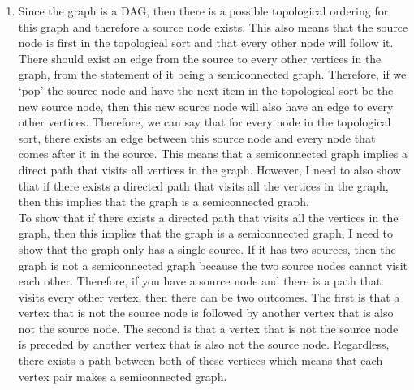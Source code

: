 \documentclass[11pt]{article}
\begin{document}
\begin{enumerate}[label=(\alph*)]
\item
Since the graph is a DAG, then there is a possible topological ordering for this graph and therefore a source node exists. This also means that the source node is first in the topological sort and that every other node will follow it. There should exist an edge from the source to every other vertices in the graph, from the statement of it being a semiconnected graph. Therefore, if we `pop' the source node and have the next item in the topological sort be the new source node, then this new source node will also have an edge to every other vertices. Therefore, we can say that for every node in the topological sort, there exists an edge between this source node and every node that comes after it in the source. This means that a semiconnected graph implies a direct path that visits all vertices in the graph. However, I need to also show that if there exists a directed path that visits all the vertices in the graph, then this implies that the graph is a semiconnected graph.
\vspace*{1\baselineskip}
\\
To show that if there exists a directed path that visits all the vertices in the graph, then this implies that the graph is a semiconnected graph, I need to show that the graph only has a single source. If it has two sources, then the graph is not a semiconnected graph because the two source nodes cannot visit each other. Therefore, if you have a source node and there is a path that visits every other vertex, then there can be two outcomes. The first is that a vertex that is not the source node is followed by another vertex that is also not the source node. The second is that a vertex that is not the source node is preceded by another vertex that is also not the source node. Regardless, there exists a path between both of these vertices which means that each vertex pair makes a semiconnected graph.



\end{enumerate}



\newpage
\end{document}
